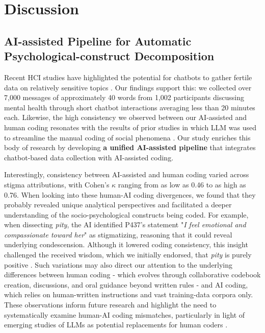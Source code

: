 \section{Discussion}

\subsection{AI-assisted Pipeline for Automatic Psychological-construct Decomposition}

Recent HCI studies have highlighted the potential for chatbots to gather fertile data on relatively sensitive topics \cite{chatbot_aq27_practice_lee_2023, disclosure_lee_2022, chatbot_reduce_kim_2020}. 
Our findings support this: we collected over 7,000 messages of approximately 40 words from 1,002 participants discussing mental health through short chatbot interactions averaging less than 20 minutes each.
Likewise, the high consistency we observed between our AI-assisted and human coding resonates with the results of prior studies in which LLM was used to streamline the manual coding of social phenomena \cite{coding_deductive_llm_tai_2024, deductive_labelling_xiao_2023}. 
Our study enriches this body of research by developing \textbf{a unified AI-assisted pipeline} that integrates chatbot-based data collection with AI-assisted coding.


Interestingly, consistency between AI-assisted and human coding varied across stigma attributions, with Cohen's $\kappa$ ranging from as low as 0.46 to as high as 0.76. 
When looking into these human-AI coding divergences, we found that they probably revealed unique analytical perspectives and facilitated a deeper understanding of the socio-psychological constructs being coded.
For example, when dissecting \textit{pity}, the AI identified P437's statement "\textit{I feel emotional and compassionate toward her}" as stigmatizing, reasoning that it could reveal underlying condescension.
Although it lowered coding consistency, this insight challenged the received wisdom, which we initially endorsed, that \textit{pity} is purely positive \cite{attribution_model_corrigan_2003}. 
Such variations may also direct our attention to the underlying differences between human coding - which evolves through collaborative codebook creation, discussions, and oral guidance beyond written rules - and AI coding, which relies on human-written instructions and vast training-data corpora only.
These observations inform future research and highlight the need to systematically examine human-AI coding mismatches, particularly in light of emerging studies of LLMs as potential replacements for human coders \cite{coding_deductive_llm_tai_2024}.


